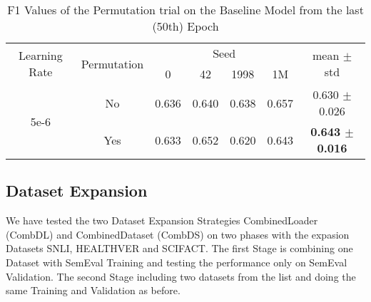 \begin{table}[t]
    \centering
    \caption{F1 Values of the Permutation trial on the Baseline Model from the last (50th) Epoch}
    \label{tab:my-permutation}
    \begin{tabular}{|c|c||cccc|c|}
    \hline
    \multirow{2}{*}{Learning Rate} & \multirow{2}{*}{Permutation} & \multicolumn{4}{c|}{Seed}                                                                    & \multirow{2}{*}{mean $\pm$ std} \\ \cline{3-6}
                                   &                              & \multicolumn{1}{c|}{0}     & \multicolumn{1}{c|}{42}    & \multicolumn{1}{c|}{1998}  & 1M    &                                 \\ \hline \hline
    \multirow{2}{*}{5e-6}          & No                           & \multicolumn{1}{c|}{0.636} & \multicolumn{1}{c|}{0.640} & \multicolumn{1}{c|}{0.638} & 0.657 & 0.630 $\pm$ 0.026               \\ \cline{2-7} 
                                   & Yes                          & \multicolumn{1}{c|}{0.633} & \multicolumn{1}{c|}{0.652} & \multicolumn{1}{c|}{0.620} & 0.643 & \textbf{0.643 $\pm$ 0.016}      \\ \hline
    \end{tabular}
\end{table}














\subsection{Dataset Expansion}\label{ch:ds}

We have tested the two Dataset Expansion Strategies CombinedLoader (CombDL) and CombinedDataset (CombDS)
on two phases with the expasion Datasets SNLI, HEALTHVER and SCIFACT. The first Stage 
is combining one Dataset with SemEval Training and testing the performance only on SemEval
Validation. The second Stage including two datasets from the list and doing the same
Training and Validation as before. 

